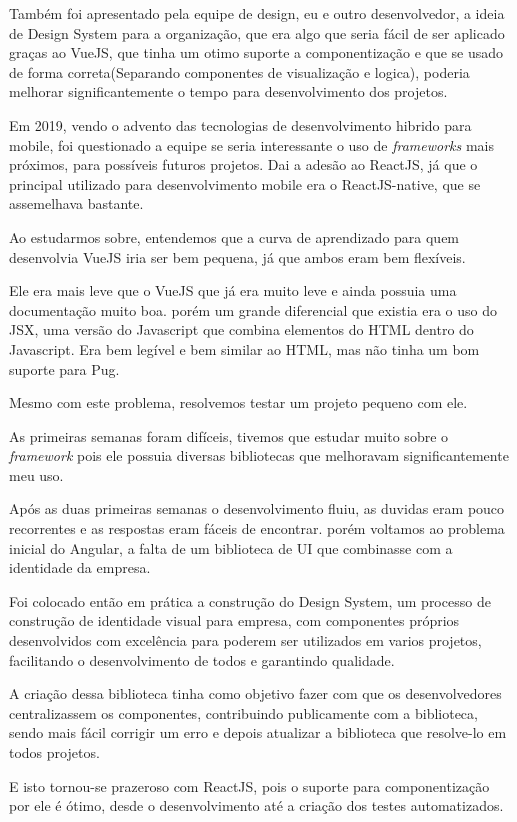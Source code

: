Também foi apresentado pela equipe de design, eu e outro desenvolvedor, a ideia de Design System para a organização, que era algo que seria fácil de ser aplicado graças ao VueJS, que tinha um otimo suporte a componentização e que se usado 
de forma correta(Separando componentes de visualização e logica), poderia melhorar significantemente o tempo para desenvolvimento dos projetos.

Em 2019, vendo o advento das tecnologias de desenvolvimento hibrido para mobile, foi questionado a equipe se seria interessante o uso de \textit{frameworks} mais próximos, para possíveis futuros projetos.
Dai a adesão ao ReactJS, já que o principal utilizado para desenvolvimento mobile era o ReactJS-native, que se assemelhava bastante.

Ao estudarmos sobre, entendemos que a curva de aprendizado para quem desenvolvia VueJS iria ser bem pequena, já que ambos eram bem flexíveis.

Ele era mais leve que o VueJS que já era muito leve e ainda possuia uma documentação muito boa.
porém um grande diferencial que existia era o uso do JSX, uma versão do Javascript que combina elementos do HTML dentro do Javascript. Era bem legível e bem similar ao HTML, mas não tinha um bom suporte para Pug.

Mesmo com este problema, resolvemos testar um projeto pequeno com ele. 

As primeiras semanas foram difíceis, tivemos que estudar muito sobre o \textit{framework} pois ele possuia diversas bibliotecas que melhoravam significantemente meu uso.

Após as duas primeiras semanas o desenvolvimento fluiu, as duvidas eram pouco recorrentes e as respostas eram fáceis de encontrar. porém voltamos ao problema inicial do Angular, 
a falta de um biblioteca de UI que combinasse com a identidade da empresa.

Foi colocado então em prática a construção do Design System, um processo de construção de identidade visual para empresa, com componentes próprios desenvolvidos com excelência para poderem ser utilizados em varios projetos, facilitando o desenvolvimento de todos e garantindo qualidade.

A criação dessa biblioteca tinha como objetivo fazer com que os desenvolvedores centralizassem os componentes, contribuindo publicamente com a biblioteca, sendo mais fácil corrigir um erro e depois atualizar a biblioteca que resolve-lo em todos projetos.

E isto tornou-se prazeroso com ReactJS, pois o suporte para componentização por ele é ótimo, desde o desenvolvimento até a criação dos testes automatizados.
